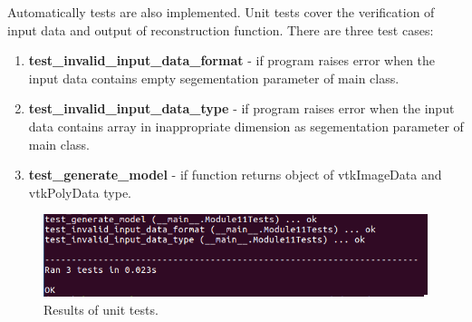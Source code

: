 \indent Automatically tests are also implemented. Unit tests cover the verification of  input data and output of reconstruction function. There are three test cases:
\begin{enumerate}
\item \textbf{test\_invalid\_input\_data\_format} - if program raises error when the input data contains empty segementation parameter of main class. 
\item \textbf{test\_invalid\_input\_data\_type} - if program raises error when the input data contains array in inappropriate dimension as segementation parameter of main class.
\item \textbf{test\_generate\_model} - if function returns object of vtkImageData and vtkPolyData type.
\end{enumerate}
\begin{figure}[H]
\centering{}\includegraphics[scale=0.7]{figures/Module_11/11_unit_test.png}\caption{Results of unit tests. \label{fig:figures/11_unit_test}}
\end{figure}




